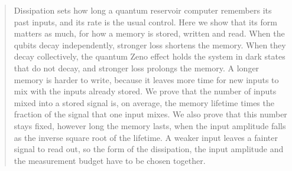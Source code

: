\begin{abstract}
Dissipation sets how long a quantum reservoir computer remembers its past inputs, and its rate is the usual control.
Here we show that its form matters as much, for how a memory is stored, written and read. When the qubits decay
independently, stronger loss shortens the memory. When they decay collectively, the quantum Zeno effect holds the
system in dark states that do not decay, and stronger loss prolongs the memory. A longer memory is harder to write,
because it leaves more time for new inputs to mix with the inputs already stored. We prove that the number of inputs
mixed into a stored signal is, on average, the memory lifetime times the fraction of the signal that one input mixes.
We also prove that this number stays fixed, however long the memory lasts, when the input amplitude falls as the
inverse square root of the lifetime. A weaker input leaves a fainter signal to read out, so the form of the
dissipation, the input amplitude and the measurement budget have to be chosen together.
\end{abstract}
